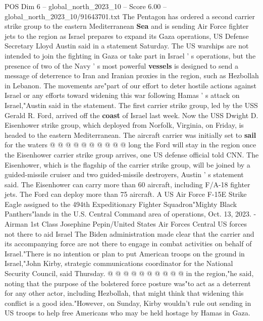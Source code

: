 \begin{textsample}{POS Dim 6 – global\_north\_2023\_10 – Score 6.00 – global\_north\_2023\_10/91643701.txt}  \label{ex:f6_pos_202}
The Pentagon has ordered a second carrier strike group to the eastern Mediterranean \textbf{Sea} and is sending Air Force fighter jets to the region as Israel prepares to expand its Gaza operations, US Defense Secretary Lloyd Austin said in a statement Saturday.
The US warships are not intended to join the fighting in Gaza or take part in Israel ' s operations, but the presence of two of the Navy ' s most powerful \textbf{vessels} is designed to send a message of deterrence to Iran and Iranian proxies in the region, such as Hezbollah in Lebanon.
The movements are"part of our effort to deter hostile actions against Israel or any efforts toward widening this war following Hamas ' s attack on Israel,"Austin said in the statement.
The first carrier strike group, led by the USS Gerald R.
Ford, arrived off the \textbf{coast} of Israel last week.
Now the USS Dwight D.
Eisenhower strike group, which deployed from Norfolk, Virginia, on Friday, is headed to the eastern Mediterranean.
The aircraft carrier was initially set to \textbf{sail} for the waters @ @ @ @ @ @ @ @ @ @ long the Ford will stay in the region once the Eisenhower carrier strike group arrives, one US defense official told CNN.
The Eisenhower, which is the flagship of the carrier strike group, will be joined by a guided-missile cruiser and two guided-missile destroyers, Austin ' s statement said.
The Eisenhower can carry more than 60 aircraft, including F/A-18 fighter jets.
The Ford can deploy more than 75 aircraft.
A US Air Force F-15E Strike Eagle assigned to the 494th Expeditionary Fighter Squadron"Mighty Black Panthers"lands in the U.S.
Central Command area of operations, Oct. 13, 2023. - Airman 1st Class Josephine Pepin/United States Air Forces Central US forces not there to aid Israel The Biden administration made clear that the carrier and its accompanying force are not there to engage in combat activities on behalf of Israel."There is no intention or plan to put American troops on the ground in Israel,"John Kirby, strategic communications coordinator for the National Security Council, said Thursday. @ @ @ @ @ @ @ @ @ @ in the region,"he said, noting that the purpose of the bolstered force posture was"to act as a deterrent for any other actor, including Hezbollah, that might think that widening this conflict is a good idea."However, on Sunday, Kirby wouldn't rule out sending in US troops to help free Americans who may be held hostage by Hamas in Gaza.

\end{textsample}
